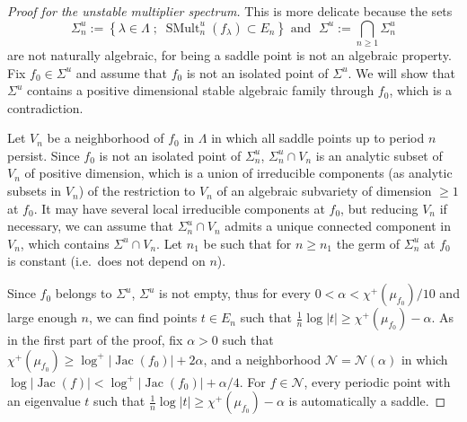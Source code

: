 \documentclass[oneside, 12pt]{amsart}
\newcommand{\set}[1]{\left\{#1\right\}}
\newcommand{\abs}[1]{\left\vert#1\right\vert}
\newcommand{\unsur}[1]{\frac{1}{#1}}
\DeclareMathOperator{\jac}{Jac}
\DeclareMathOperator{\SMult}{SMult}
\theoremstyle{plain}
\theoremstyle{definition}
\numberwithin{equation}{section}       %
\numberwithin{equation}{section}       %
\begin{document}
\begin{proof}[Proof for the unstable  multiplier spectrum] 

This is more delicate because the sets
\begin{equation}\label{eq:Sigmaun}
\Sigma^u_n :=   \set{\lambda \in \Lambda \; ; \;  \SMult^u_n(f_\lambda) \subset E_n} \text{ and } \; \Sigma^u := \bigcap_{n\geq 1} \Sigma_n^u  
\end{equation}
are not  naturally algebraic, for being a saddle point is not an algebraic property. 
Fix $f_0\in \Sigma^u$ 
and assume that $f_0$ is not an isolated point of $\Sigma^u$. 
We will show that $\Sigma^u$ contains a positive dimensional stable algebraic family through $f_0$, which is a contradiction. 

Let $V_n$ be a  neighborhood of $f_0$ in $\Lambda$ 
in which all saddle points up to period $n$ persist. Since 
  $f_0$ is not an isolated point of $\Sigma_n^u$, 
 $\Sigma^u_n\cap V_n$ is an analytic subset of $V_n$ 
of positive dimension,  which is a union 
 of irreducible components (as analytic subsets in $V_n$)
 of the  restriction to $V_n$ of an algebraic subvariety of dimension $\geq 1$ at $f_0$. 
 It may have several local 
 irreducible components at $f_0$, but reducing $V_n$ if necessary, we can assume that $\Sigma^u_n\cap V_n$ admits a unique connected component in $V_n$, 
 which contains   $\Sigma^u\cap V_n$. Let $n_1$ be such that 
 for $n\geq n_1$ the germ of $\Sigma^u_n$ at $f_0$ is constant (i.e.\ does not depend on $n$). 
   
Since $f_0$ belongs to $\Sigma^u$, $\Sigma^u$ is not empty, thus for every  
  $0<\alpha<\chi^+(\mu_{f_0})/10$ 
and   large enough $n$, we can find points $t\in E_n$  such that 
$\unsur{n}\log\abs{t}\geq \chi^+(\mu_{f_0})-\alpha$. 
As in the first part of the proof, fix $\alpha>0$   such that 
$\chi^+(\mu_{f_0})\geq \log^+\abs{\jac(f_0)}+2\alpha$, 
and a neighborhood $\mathcal N  = \mathcal N(\alpha)$ in which 
$\log\abs{\jac(f)}< \log^+\abs{\jac(f_0)} + \alpha/4$. 
For   $f\in \mathcal N$, every periodic point with an eigenvalue $t$ such that 
$\unsur{n}\log\abs{t}\geq \chi^+(\mu_{f_0})-\alpha$ is automatically a saddle. 


\end{proof}
\end{document}
